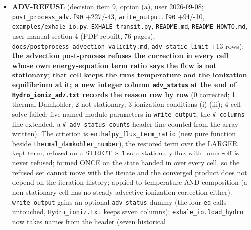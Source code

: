 \documentclass[english,a4paper]{my_memo}
\begin{document}
\begin{itemize}
  solve stagnates at 1.957), so this rung stands as a measurement of that
  state\textquotesingle s row, not as evidence that the solve converges. B5f also MEASURED
  that the coupled route\textquotesingle s convergence depends on \texttt{eq\_sweep\_reltol}
  (1e-10 loses the 1e-9 solve at iteration 17), the same fact from the
  other side. Recorded: the JFNK of a reloaded 1e-8 state starts from
  \texttt{\textbar{}\textbar{}R\textbar{}\textbar{}\ =\ 1.226} because the marching loop takes two CFL steps first (the
  O(dt) kick, eight decades, seen for the first time from a stationary
  state); the certification prints no cell-resolved record of the species
  rows, which blocks any floor attribution.
\item
  \textbf{ADV-REFUSE} (decision item 9, option (a), user 2026-09-08;
  \texttt{post\_process\_adv.f90} +227/-43, \texttt{write\_output.f90} +94/-10,
  \texttt{examples/exhale\_io.py}, \texttt{EXHALE\_transit.py}, \texttt{README.md},
  \texttt{README\_HOWTO.md}, user manual section 4 (PDF rebuilt, 76 pages),
  \texttt{docs/postprocess\_advection\_validity.md}, \texttt{adv\_static\_limit} +13 rows):
  \textbf{the advection post-process refuses the correction in every cell whose
  own energy-equation term ratio says the flow is not stationary; that cell
  keeps the run\textquotesingle s temperature and the ionization equilibrium at it; a new
  integer column \texttt{adv\_status} at the end of \texttt{Hydro\_ioniz\_adv.txt} records
  the reason row by row} (0 corrected; 1 thermal Damkohler; 2 not
  stationary; 3 ionization conditions (i)-(iii); 4 cell solve failed; five
  named module parameters in \texttt{write\_output}, the \texttt{\#\ columns} line extended,
  a \texttt{\#\ adv\_status\_counts} header line counted from the array written).
  The criterion is \texttt{enthalpy\_flux\_term\_ratio} (new pure function beside
  \texttt{thermal\_damkohler\_number}), the restored term over the LARGER kept term,
  refused on a STRICT \texttt{\textgreater{}\ 1} so a stationary flux with round-off is never
  refused; formed ONCE on the state handed in over every cell, so the
  refused set cannot move with the iterate and the converged product does
  not depend on the iteration history; applied to temperature AND
  composition (a non-stationary cell has no steady advective ionization
  correction either). \texttt{write\_output} gains an optional \texttt{adv\_status} dummy
  (the four \texttt{\textquotesingle{}eq\textquotesingle{}} calls untouched, \texttt{Hydro\_ioniz.txt} keeps seven columns);
  \texttt{exhale\_io.load\_hydro} now takes names from the header (seven historical

\end{itemize}
\end{document}
